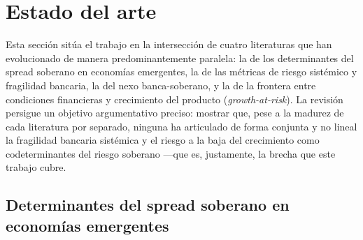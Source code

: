 \section{Estado del arte}

Esta sección sitúa el trabajo en la intersección de cuatro literaturas que han evolucionado de manera predominantemente paralela: la de los determinantes del spread soberano en economías emergentes, la de las métricas de riesgo sistémico y fragilidad bancaria, la del nexo banca-soberano, y la de la frontera entre condiciones financieras y crecimiento del producto (\textit{growth-at-risk}). La revisión persigue un objetivo argumentativo preciso: mostrar que, pese a la madurez de cada literatura por separado, ninguna ha articulado de forma conjunta y no lineal la fragilidad bancaria sistémica y el riesgo a la baja del crecimiento como codeterminantes del riesgo soberano —que es, justamente, la brecha que este trabajo cubre.

\subsection{Determinantes del spread soberano en economías emergentes}

